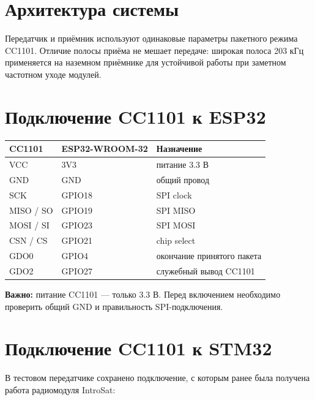 \documentclass[11pt,a4paper]{article}
\begin{document}
\section{Архитектура системы}

\begin{center}
\end{center}

Передатчик и приёмник используют одинаковые параметры пакетного режима CC1101. Отличие полосы приёма не мешает передаче: широкая полоса 203 кГц применяется на наземном приёмнике для устойчивой работы при заметном частотном уходе модулей.

\section{Подключение CC1101 к ESP32}

\begin{center}
\begin{tabular}{lll}
\toprule
\textbf{CC1101} & \textbf{ESP32-WROOM-32} & \textbf{Назначение}\\
\midrule
VCC & 3V3 & питание 3.3 В\\
GND & GND & общий провод\\
SCK & GPIO18 & SPI clock\\
MISO / SO & GPIO19 & SPI MISO\\
MOSI / SI & GPIO23 & SPI MOSI\\
CSN / CS & GPIO21 & chip select\\
GDO0 & GPIO4 & окончание принятого пакета\\
GDO2 & GPIO27 & служебный вывод CC1101\\
\bottomrule
\end{tabular}
\end{center}

\textbf{Важно:} питание CC1101 — только 3.3 В. Перед включением необходимо проверить общий GND и правильность SPI-подключения.

\section{Подключение CC1101 к STM32}

В тестовом передатчике сохранено подключение, с которым ранее была получена работа радиомодуля IntroSat:
\end{document}
